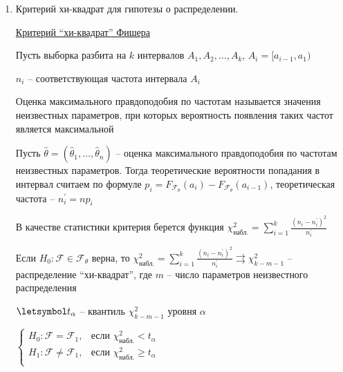 \begin{enumerate}
    Критерий: $\letsymbol t_\alpha$ -- квантиль $\chi^2_{k - 1}$ уровня $\alpha$

    $\begin{cases}
        H_0 : \mathcal{F} = \mathcal{F}_1, & \text{если } \chi^2_\text{набл.} < t_\alpha \\
        H_1 : \mathcal{F} \neq \mathcal{F}_1, & \text{если } \chi^2_\text{набл.} \geq t_\alpha \\
    \end{cases}$

    \Nota Часто обозначают $t_\alpha = \chi^2_\text{теор.}$

    \item Критерий хи-квадрат для гипотезы о распределении.

    \hyperlink{chi_square_fishers_criterion}{Критерий \enquote{хи-квадрат} Фишера}

    Пусть выборка разбита на $k$ интервалов $A_1, A_2, \dots, A_k$, $A_i = [a_{i - 1}, a_1)$

    $n_i$ -- соответствующая частота интервала $A_i$

    \Def Оценка максимального правдоподобия по частотам называется значения неизвестных параметров,
    при которых вероятность появления таких частот является максимальной

    Пусть $\hat \theta = (\hat \theta_1, \dots, \hat \theta_n)$ -- оценка максимального правдоподобия 
    по частотам неизвестных параметров. Тогда теоретические вероятности попадания в интервал считаем по формуле 
    $p_i = F_{\mathcal{F}_\theta} (a_i) - F_{\mathcal{F}_\theta} (a_{i - 1})$, теоретическая частота -- $n_i^\prime = n p_i$

    В качестве статистики критерия берется функция $\chi^2_\text{набл.} = \sum_{i = 1}^k \frac{(n_i - n_i^\prime)^2}{n_i^\prime}$

    \begin{MyTheorem}
        
        Если $H_0 : \mathcal{F} \in \mathcal{F}_\theta$ верна, 
        то $\chi^2_\text{набл.} = \sum_{i = 1}^k \frac{(n_i - n_i^\prime)^2}{n_i^\prime} \rightrightarrows \chi^2_{k - m - 1}$ -- 
        распределение \enquote{хи-квадрат}, где $m$ -- число параметров неизвестного распределения
    \end{MyTheorem}
    
    $\letsymbol t_\alpha$ -- квантиль $\chi^2_{k - m - 1}$ уровня $\alpha$

    $\begin{cases}
        H_0 : \mathcal{F} = \mathcal{F}_1, & \text{если } \chi^2_\text{набл.} < t_\alpha \\
        H_1 : \mathcal{F} \neq \mathcal{F}_1, & \text{если } \chi^2_\text{набл.} \geq t_\alpha \\
    \end{cases}$


\end{enumerate}
